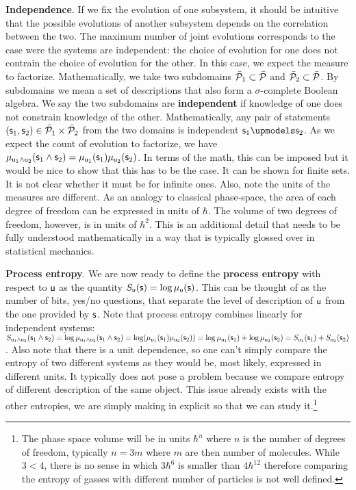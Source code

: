 \documentclass[10pt, onecolumn, longbibliography, nofootinbib]{revtex4-2}
\begin{document}
\textbf{Independence}. If we fix the evolution of one subsystem, it should be intuitive that the possible evolutions of another subsystem depends on the correlation between the two. The maximum number of joint evolutions corresponds to the case were the systems are independent: the choice of evolution for one does not contrain the choice of evolution for the other. In this case, we expect the measure to factorize. Mathematically, we take two subdomains $\tdomain[P]_1 \subset \tdomain[P]$ and $\tdomain[P]_2 \subset \tdomain[P]$. By subdomains we mean a set of descriptions that also form a $\sigma$-complete Boolean algebra. We say the two subdomains are \textbf{independent} if knowledge of one does not constrain knowledge of the other. Mathematically, any pair of statements $(\stmt_1, \stmt_2) \in \tdomain[P]_1 \times \tdomain[P]_2$ from the two domains is independent $\stmt_1 \indep \stmt_2$. As we expect the count of evolution to factorize, we have $ \mu_{\stmt[u]_1 \AND \stmt[u]_2}(\stmt_1 \AND \stmt_2) = \mu_{\stmt[u]_1}(\stmt_1) \mu_{\stmt[u]_2}(\stmt_2)$. In terms of the math, this can be imposed but it would be nice to show that this has to be the case. It can be shown for finite sets. It is not clear whether it must be for infinite ones. Also, note the units of the measures are different. As an analogy to classical phase-space, the area of each degree of freedom can be expressed in units of $\hbar$. The volume of two degrees of freedom, however, is in units of $\hbar^2$. This is an additional detail that needs to be fully understood mathematically in a way that is typically glossed over in statistical mechanics.

\textbf{Process entropy}. We are now ready to define the \textbf{process entropy} with respect to $\stmt[u]$ as the quantity $S_{\stmt[u]}(\stmt) = \log \mu_{\stmt[u]}(\stmt)$. This can be thought of as the number of bits, yes/no questions, that separate the level of description of $\stmt[u]$ from the one provided by $\stmt$. Note that process entropy combines linearly for independent systems: $S_{\stmt[u]_1 \AND \stmt[u]_2}(\stmt_1 \AND \stmt_2) = \log \mu_{\stmt[u]_1 \AND \stmt[u]_2}(\stmt_1 \AND \stmt_2) = \log (\mu_{\stmt[u]_1}(\stmt_1) \mu_{\stmt[u]_2}(\stmt_2)) = \log \mu_{\stmt[u]_1}(\stmt_1) + \log \mu_{\stmt[u]_2}(\stmt_2) = S_{\stmt[u]_1}(\stmt_1) + S_{\stmt[u]_2}(\stmt_2)$. Also note that there is a unit dependence, so one can't simply compare the entropy of two different systems as they would be, most likely, expressed in different units.  It typically does not pose a problem because we compare entropy of different description of the same object. This issue already exists with the other entropies, we are simply making in explicit so that we can study it.\footnote{The phase space volume will be in units $\hbar^n$ where $n$ is the number of degrees of freedom, typically $n=3m$ where $m$ are then number of molecules. While $3 < 4$, there is no sense in which $3 \hbar^6$ is smaller than $4 \hbar^{12}$ therefore comparing the entropy of gasses with different number of particles is not well defined.}
\end{document}
